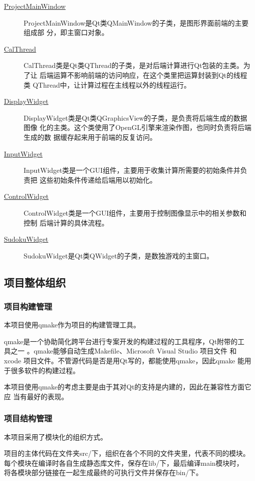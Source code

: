 \documentclass[12pt]{article}
\begin{document}
\begin{description}
\item[\underline{ProjectMainWindow}]
  ProjectMainWindow是Qt类QMainWindow的子类，是图形界面前端的主要组成部
  分，即主窗口对象。
\item[\underline{CalThread}]
  CalThread类是Qt类QThread的子类，是对后端计算进行Qt包装的主类。为了让
  后端运算不影响前端的访问响应，在这个类里把运算封装到Qt的线程类
  QThread中，让计算过程在主线程以外的线程运行。
\item[\underline{DisplayWidget}]
  DisplayWidget类是Qt类QGraphicsView的子类，是负责将后端生成的数据图像
  化的主类。这个类使用了OpenGL引擎来渲染作图，也同时负责将后端生成的数
  据缓存起来用于前端的反复访问。
\item[\underline{InputWidget}]
  InputWidget类是一个GUI组件，主要用于收集计算所需要的初始条件并负责把
  这些初始条件传递给后端用以初始化。
\item[\underline{ControlWidget}]
  ControlWidget类是一个GUI组件，主要用于控制图像显示中的相关参数和控制
  后端计算的具体流程。
\item[\underline{SudokuWidget}]
  SudokuWidget是Qt类QWidget的子类，是数独游戏的主窗口。
\end{description}

\subsection{项目整体组织}

\subsubsection{项目构建管理}

本项目使用qmake作为项目的构建管理工具。

qmake\cite{qt}是一个协助简化跨平台进行专案开发的构建过程的工具程序，Qt附带的工
具之一 。qmake能够自动生成Makefile、Microsoft Visual Studio 项目文件
和 xcode 项目文件。不管源代码是否是用Qt写的，都能使用qmake，因此qmake
能用于很多软件的构建过程。

本项目使用qmake的考虑主要是由于其对Qt的支持是内建的，因此在兼容性方面它应
当有最好的表现。

\subsubsection{项目结构管理}
本项目采用了模块化的组织方式。

项目的主体代码在文件夹src/下，组织在各个不同的文件夹里，代表不同的模块。
每个模块在编译时各自生成静态库文件，保存在lib/下，最后编译main模块时，
将各模块部分链接在一起生成最终的可执行文件并保存在bin/下。
\end{document}
